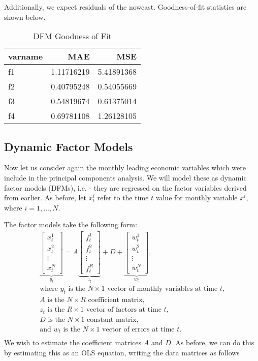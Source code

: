 \documentclass[11pt, letterpaper]{article}\usepackage[]{graphicx}\usepackage[]{color}
\begin{document}
Additionally, we expect residuals of the nowcast. Goodness-of-fit statistics are shown below.
\begin{table}[H]
\centering
\begingroup\footnotesize
\begin{tabular}{lrr}
  \hline
varname & MAE & MSE \\ 
  \hline
f1 & 1.11716219 & 5.41891368 \\ 
  f2 & 0.40795248 & 0.54055669 \\ 
  f3 & 0.54819674 & 0.61375014 \\ 
  f4 & 0.69781108 & 1.26128105 \\ 
   \hline
\end{tabular}
\endgroup
\caption{DFM Goodness of Fit} 
\end{table}




\subsection{Dynamic Factor Models}
Now let us consider again the monthly leading economic variables which were include in the principal components analysis. We will model these as dynamic factor models (DFMs), i.e. - they are regressed on the factor variables derived from earlier. As before, let $x^i_t$ refer to the time $t$ value for monthly variable $x^i$, where $i = 1, \dots, N$.

The factor models take the following form:
\begin{align*}
\underbrace{\begin{bmatrix}
	x^1_t\\
	x^2_t\\
	\vdots \\
	x^N_t
\end{bmatrix}}_{y_t}
=
A
\underbrace{\begin{bmatrix}
	f^1_{t}\\
	f^2_{t}\\
	\vdots \\
	f^R_{t}
\end{bmatrix}}_{z_t}
+
D 
+
\underbrace{\begin{bmatrix}
	w^1_t\\
	w^2_t\\
	\vdots\\
	w^N_t
\end{bmatrix}}_{w_t},\\
\text{where $y_t$ is the $N \times 1$ vector of monthly variables at time $t$,}\\
\text{$A$ is the $N \times R$ coefficient matrix,}\\
\text{$z_t$ is the $R \times 1$ vector of factors at time $t$,}\\
\text{$D$ is the $N \times 1$ constant matrix,}\\
\text{and $w_t$ is the $N \times 1$ vector of errors at time $t$.}\\
\end{align*}
We wish to estimate the coefficient matrices $A$ and $D$. As before, we can do this by estimating this as an OLS equation, writing the data matrices as follows
\end{document}
